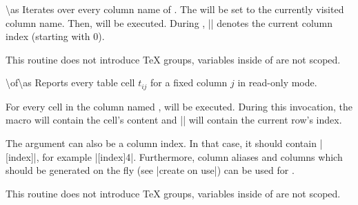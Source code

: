 \documentclass[a4paper]{ltxdoc}
\begin{document}
\begin{command}{\pgfplotstableforeachcolumn{}\textbackslash as}
    Iterates over every column name of . The  will be set to the currently visited column name. Then, 
    will be executed. During , |\pgfplotstablecol| denotes the
    current column index (starting with 0).
\begin{codeexample}[]
\begin{minipage}{0.8\linewidth}
\loadedtable
\pgfplotstableforeachcolumn\loadedtable\as{}
\end{minipage}
\end{codeexample}

    This routine does not introduce \TeX{} groups, variables inside of
     are not scoped.
\end{command}

\begin{command}{\pgfplotstableforeachcolumnelement{}\textbackslash of\textbackslash as}
    Reports every table cell $t_{ij}$ for a fixed column $j$ in read-only mode.

    For every cell in the column named ,  will be
    executed. During this invocation, the macro  will contain the cell's content and |\pgfplotstablerow| will
    contain the current row's index.
\begin{codeexample}[]
\begin{minipage}{0.8\linewidth}
\loadedtable
{}\of\loadedtable\as{}
\end{minipage}
\end{codeexample}
    The argument  can also be a column index. In that case,
    it should contain |[index]|, for example |[index]4|.
    Furthermore, column aliases and columns which should be generated on the
    fly (see |create on use|) can be used for .

    This routine does not introduce \TeX{} groups, variables inside of
     are not scoped.
\end{command}
\end{document}

